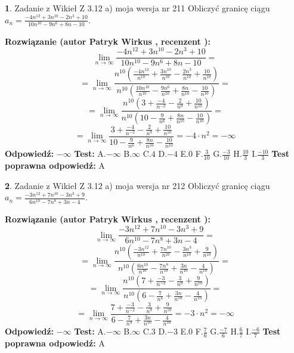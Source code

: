\documentclass[12pt, a4paper]{article}
\theoremstyle{definition} %
\newtheorem{zad}{}
\newcommand{\zadStart}[1]{\begin{zad}#1\newline}
\newcommand{\zadStop}{\end{zad}}
\newcommand{\rozwStart}[2]{\noindent \textbf{Rozwiązanie (autor #1 , recenzent #2): }\newline}
\newcommand{\rozwStop}{\newline}
\newcommand{\odpStart}{\noindent \textbf{Odpowiedź:}\newline}
\newcommand{\odpStop}{\newline}
\newcommand{\testStart}{\noindent \textbf{Test:}\newline}
\newcommand{\testStop}{\newline}
\newcommand{\kluczStart}{\noindent \textbf{Test poprawna odpowiedź:}\newline}
\newcommand{\kluczStop}{\newline}
\begin{document}
\zadStart{Zadanie z Wikieł Z 3.12 a) moja wersja nr 211}
Obliczyć granicę ciągu $a_{n}=\frac{-4n^{12}+3n^{10}-2n^{3}+10}{10n^{10}-9n^{6}+8n-10}$.
\zadStop
\rozwStart{Patryk Wirkus}{}
$$\lim\limits_{n\to\infty}\frac{-4n^{12}+3n^{10}-2n^{3}+10}{10n^{10}-9n^{6}+8n-10}=$$
$$=\lim\limits_{n\to\infty}\frac{n^{10}\left(\frac{-4n^{12}}{n^{10}}+\frac{3n^{10}}{n^{10}}-\frac{2n^{3}}{n^{10}}+\frac{10}{n^{10}}\right)}{n^{10}\left(\frac{10n^{10}}{n^{10}}-\frac{9n^{6}}{n^{10}}+\frac{8n}{n^{10}}-\frac{10}{n^{10}}\right)}=$$
$$=\lim\limits_{n\to\infty}\frac{n^{10}\left(3+\frac{-4}{n^{-2}}-\frac{2}{n^{9}}+\frac{10}{n^{10}}\right)}
{n^{10}\left(10-\frac{9}{n^{6}}+\frac{8n}{n^{10}}-\frac{10}{n^{10}}\right)}=$$
$$=\lim\limits_{n\to\infty}\frac{3+\frac{-4}{n^{-2}}-\frac{2}{n^{9}}+\frac{10}{n^{10}}}{10-\frac{9}{n^{6}}+\frac{8n}{n^{10}}-\frac{10}{n^{10}}}=-4\cdot n^{2} = -\infty$$
\rozwStop
\odpStart
$-\infty$
\odpStop
\testStart
A.$-\infty$
B.$\infty$
C.$4$
D.$-4$
E.$0$
F.$\frac{3}{10}$
G.$\frac{-3}{10}$
H.$\frac{10}{3}$
I.$\frac{-10}{3}$
\testStop
\kluczStart
A
\kluczStop



\zadStart{Zadanie z Wikieł Z 3.12 a) moja wersja nr 212}
Obliczyć granicę ciągu $a_{n}=\frac{-3n^{12}+7n^{10}-3n^{3}+9}{6n^{10}-7n^{8}+3n-4}$.
\zadStop
\rozwStart{Patryk Wirkus}{}
$$\lim\limits_{n\to\infty}\frac{-3n^{12}+7n^{10}-3n^{3}+9}{6n^{10}-7n^{8}+3n-4}=$$
$$=\lim\limits_{n\to\infty}\frac{n^{10}\left(\frac{-3n^{12}}{n^{10}}+\frac{7n^{10}}{n^{10}}-\frac{3n^{3}}{n^{10}}+\frac{9}{n^{10}}\right)}{n^{10}\left(\frac{6n^{10}}{n^{10}}-\frac{7n^{8}}{n^{10}}+\frac{3n}{n^{10}}-\frac{4}{n^{10}}\right)}=$$
$$=\lim\limits_{n\to\infty}\frac{n^{10}\left(7+\frac{-3}{n^{-2}}-\frac{3}{n^{9}}+\frac{9}{n^{10}}\right)}
{n^{10}\left(6-\frac{7}{n^{4}}+\frac{3n}{n^{10}}-\frac{4}{n^{10}}\right)}=$$
$$=\lim\limits_{n\to\infty}\frac{7+\frac{-3}{n^{-2}}-\frac{3}{n^{9}}+\frac{9}{n^{10}}}{6-\frac{7}{n^{4}}+\frac{3n}{n^{10}}-\frac{4}{n^{10}}}=-3\cdot n^{2} = -\infty$$
\rozwStop
\odpStart
$-\infty$
\odpStop
\testStart
A.$-\infty$
B.$\infty$
C.$3$
D.$-3$
E.$0$
F.$\frac{7}{6}$
G.$\frac{-7}{6}$
H.$\frac{6}{7}$
I.$\frac{-6}{7}$
\testStop
\kluczStart
A
\kluczStop
\end{document}
